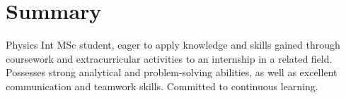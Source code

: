 
\section{Summary}
Physics Int MSc student,  eager to apply knowledge and skills gained through coursework and extracurricular activities to an internship in a related field.
Possesses strong analytical and problem-solving abilities, as well as excellent communication and teamwork skills. Committed to continuous learning.
